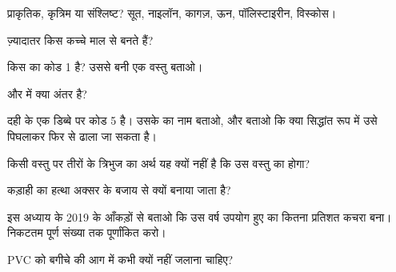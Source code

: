 \begin{exercise}[$\star$]\label{exo:g8:plastics:1}
प्राकृतिक, कृत्रिम या संश्लिष्ट? सूत, नाइलॉन, कागज़, ऊन,
पॉलिस्टाइरीन, विस्कोस।
\end{exercise}

\begin{exercise}[$\star$]\label{exo:g8:plastics:2}
ज़्यादातर  किस कच्चे माल से बनते हैं?
\end{exercise}

\begin{exercise}[$\star$]\label{exo:g8:plastics:3}
किस  का कोड 1 है? उससे बनी एक वस्तु बताओ।
\end{exercise}

\begin{exercise}[$\star$]\label{exo:g8:plastics:4}
 और  में क्या अंतर है?
\end{exercise}

\begin{exercise}[$\star\star$]\label{exo:g8:plastics:5}
दही के एक डिब्बे पर कोड 5 है। उसके  का नाम बताओ, और बताओ कि
क्या सिद्धांत रूप में उसे पिघलाकर फिर से ढाला जा सकता है।
\end{exercise}

\begin{exercise}[$\star\star$]\label{exo:g8:plastics:6}
किसी वस्तु पर तीरों के त्रिभुज का अर्थ यह क्यों नहीं है कि उस वस्तु का
 होगा?
\end{exercise}

\begin{exercise}[$\star\star$]\label{exo:g8:plastics:7}
कड़ाही का हत्था अक्सर  के बजाय  से क्यों बनाया
जाता है?
\end{exercise}

\begin{exercise}[$\star\star$]\label{exo:g8:plastics:8}
इस अध्याय के 2019 के आँकड़ों से बताओ कि उस वर्ष उपयोग हुए  का
कितना प्रतिशत कचरा बना। निकटतम पूर्ण संख्या तक पूर्णांकित करो।
\end{exercise}

\begin{exercise}[$\star\star$]\label{exo:g8:plastics:9}
PVC को बगीचे की आग में कभी क्यों नहीं जलाना चाहिए?
\end{exercise}

